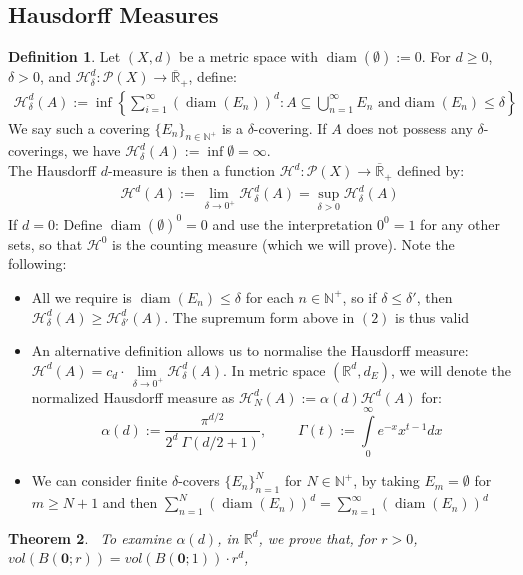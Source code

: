 \documentclass{article}
\theoremstyle{plain}
\newtheorem{thm}{Theorem}[section]
\theoremstyle{definition}
\newtheorem{defn}[thm]{Definition}
\DeclareMathOperator{\diam}{diam}
\theoremstyle{remark}
\begin{document}
\subsection{Hausdorff Measures}
\begin{defn}
    Let $(X, d)$ be a metric space with $\diam (\emptyset) :=0$. For $d \geq 0$, $\delta > 0$, and $\mathcal{H}^d_\delta :\mathcal{P}(X) \to \overline{\mathbb{R}}_{ +} $, define:
        \begin{align}
            \mathcal{H}_\delta^d(A) := \inf\left\{\sum \limits _{i =1}^\infty (\diam (E_n))^d : A \subseteq \bigcup \limits _{n=1}^\infty E_n \text { and} \diam(E_n) \le \delta \right\}
        \end{align}
        We say such a covering $\{E_n\}_{n\in \mathbb{N}^+}$ is a $\delta$-covering. If $A$ does not possess any $\delta$-coverings, we have $\mathcal{H}_\delta ^d(A) := \inf \emptyset =\infty $.
        \\ The Hausdorff $d$-measure is then a function $\mathcal{H}^d: \mathcal{P}(X) \to \overline{\mathbb{R}}_+$ defined by:
        \begin{align}
            \mathcal{H}^d(A) := \lim_{\ \delta \to 0^+} \mathcal{H}_\delta^d(A) = \sup_{\delta > 0} \mathcal{H}_\delta^d(A)
        \end{align}
         If $ d=0$: Define $\diam (\emptyset)^0=0$ and use the interpretation $0^0=1$ for any other sets, so that $\mathcal{H}^0$ is the counting measure (which we will prove). Note the following:
    
    \begin{itemize}
        \item All we require is $\diam (E_n) \le \delta $ for each $n \in \mathbb{N}^+$, so if $\delta \le \delta'$, then $ \mathcal{H}_\delta ^d(A) \ge \mathcal{H}_{\delta'}^d(A) $. The supremum form above in $(2)$ is thus valid
        \item An alternative definition allows us to normalise the Hausdorff measure: $\mathcal{H}^d(A) = c_d \cdot \lim \limits _{\ \delta \to 0^+} \mathcal{H}_\delta^d(A)$. In metric space $(\mathbb{R}^d, d_E)$, we will denote the normalized Hausdorff measure as $\mathcal{H}^d_N(A) :=\alpha (d) \mathcal{H}^d(A)$ for:
            \[
            \alpha (d) :=\frac{\pi ^{d/2}}{2^d \ \Gamma (d/2 + 1)}, \ \ \ \ \ \ \ \ \ \ \Gamma (t):= \int \limits _0 ^\infty e^{-x}x^{t-1}dx
            \]
        \item We can consider finite $\delta$-covers $\{E_n\}_{n=1}^N$ for $N\in \mathbb{N}^+$, by taking $E_m=\emptyset$ for $m\ge N+1$ and then $\sum \limits _{n=1}^N (\diam (E_n))^d = \sum \limits _{n=1}^\infty (\diam (E_n))^d$
    \end{itemize}
\end{defn}
\begin{thm}~\label{thm:ball_vol}
    To examine $\alpha (d)$, in $\mathbb{R}^d$, we prove that, for $r > 0$, $vol(B(\mathbf{0}; r)) = vol(B(\mathbf{0};1)) \cdot r^d$,
\end{thm}
\end{document}
